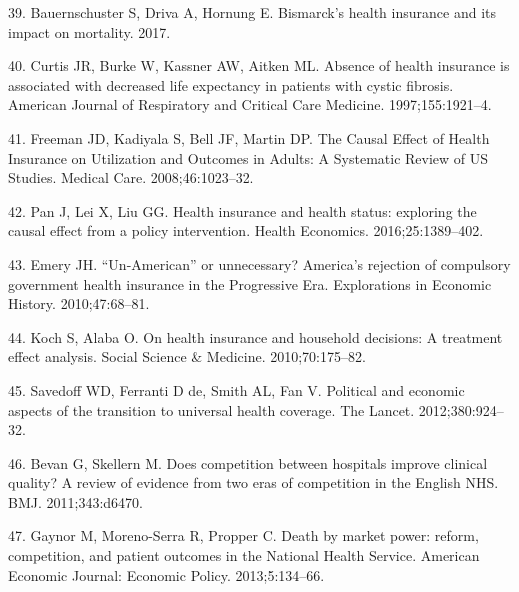 \documentclass[]{elsarticle} %
\begin{document}
\leavevmode\hypertarget{ref-bauernschuster2017bismarck}{}%
39. Bauernschuster S, Driva A, Hornung E. Bismarck's health insurance and its impact on mortality. 2017.

\leavevmode\hypertarget{ref-Curtis1997}{}%
40. Curtis JR, Burke W, Kassner AW, Aitken ML. Absence of health insurance is associated with decreased life expectancy in patients with cystic fibrosis. American Journal of Respiratory and Critical Care Medicine. 1997;155:1921--4.

\leavevmode\hypertarget{ref-Freeman2008}{}%
41. Freeman JD, Kadiyala S, Bell JF, Martin DP. The Causal Effect of Health Insurance on Utilization and Outcomes in Adults: A Systematic Review of US Studies. Medical Care. 2008;46:1023--32.

\leavevmode\hypertarget{ref-Pan2016}{}%
42. Pan J, Lei X, Liu GG. Health insurance and health status: exploring the causal effect from a policy intervention. Health Economics. 2016;25:1389--402.

\leavevmode\hypertarget{ref-Emery2010}{}%
43. Emery JH. ``Un-American'' or unnecessary? America's rejection of compulsory government health insurance in the Progressive Era. Explorations in Economic History. 2010;47:68--81.

\leavevmode\hypertarget{ref-koch2010health}{}%
44. Koch S, Alaba O. On health insurance and household decisions: A treatment effect analysis. Social Science \& Medicine. 2010;70:175--82.

\leavevmode\hypertarget{ref-savedoff2012political}{}%
45. Savedoff WD, Ferranti D de, Smith AL, Fan V. Political and economic aspects of the transition to universal health coverage. The Lancet. 2012;380:924--32.

\leavevmode\hypertarget{ref-bevan2011does}{}%
46. Bevan G, Skellern M. Does competition between hospitals improve clinical quality? A review of evidence from two eras of competition in the English NHS. BMJ. 2011;343:d6470.

\leavevmode\hypertarget{ref-gaynor2013death}{}%
47. Gaynor M, Moreno-Serra R, Propper C. Death by market power: reform, competition, and patient outcomes in the National Health Service. American Economic Journal: Economic Policy. 2013;5:134--66.
\end{document}
